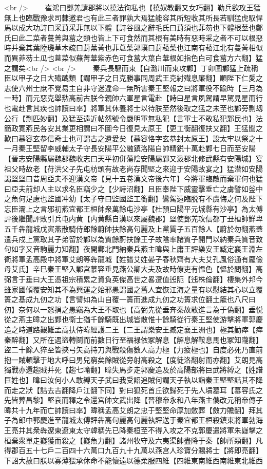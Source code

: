 <br />
　　崔鴻曰鄧羌請郡將以撓法徇私也【撓奴教翻又女巧翻】勒兵欲攻王猛無上也臨戰豫求司隸邀君也有此三者罪孰大焉猛能容其所短收其所長若馴猛虎馭悍馬以成大功詩曰采葑采菲無以下體【詩谷風之辭毛氏曰葑須也菲芴也下體根莖也鄭氏曰此二菜者蔓菁與葍之類也皆上下可食然而其根有美時有惡時采之者不可以根惡時并棄其葉陸璣草木疏曰葑蕪菁也菲蒠菜郭璞曰葑菘菜也江南有菘江北有蔓菁相似而異菲芴土瓜也蒠菜似蕪菁華紫赤色可食葍大葉白華根如指色白可食葍方六翻】猛之謂矣<br />
<br />
　　秦兵長驅而東【自潞川而東攻鄴】丁卯圍鄴猛上疏稱臣以甲子之日大殱醜類【謂甲子之日克勝事同周武王克紂殱息廉翻】順陛下仁愛之志使六州士庶不覺易主自非守迷違命一無所害秦王堅報之曰將軍役不踰時【三月為一時】而元惡克舉勲高前古朕今親帥六軍星言電赴【詩曰星言夙駕謂早駕見星而行也電赴言其疾也帥讀曰率】將軍其休養將士以待朕至然後取之猛之未至也鄴旁剽刼公行【剽匹妙翻】及猛至遠近帖然號令嚴明軍無私犯【言軍士不敢私犯鄴民也】法簡政寛燕民各安其業更相謂曰不圖今日復見太原王【更工衡翻復扶又翻】王猛聞之歎曰慕容玄恭信奇士也可謂古之遺愛矣【慕容恪字玄恭封太原王】設太牢以祭之十一月秦王堅留李威輔太子守長安陽平公融鎮洛陽自帥精鋭十萬赴鄴七日而至安陽【晉志安陽縣屬魏郡魏收志曰天平初併蕩陰安陽屬鄴又汲郡北修武縣有安陽城】宴祖父時故老【苻洪父子先屯枋頭有故老尚存聞堅之來迎于安陽故宴之】猛潜如安陽謁堅堅曰昔周亞夫不迎漢文帝【見十五卷漢文帝後六年】今將軍臨敵而棄軍何也猛曰亞夫前却人主以求名臣竊少之【少詩沼翻】且臣奉陛下威靈擊垂亡之虜譬如釡中之魚何足慮也監國冲幼【太子守曰監國監工銜翻】鸞駕遠臨脱有不虞悔之何及陛下忘臣灞上之言邪初燕宜都王桓帥衆萬餘屯沙亭【杜預曰陽平元城縣有沙亭】為太傅評後繼聞評敗引兵屯内黄【内黄縣自漢以來屬魏郡】堅使鄧羌攻信都丁丑桓帥鮮卑五千犇龍城戊寅燕散騎侍郎餘蔚帥扶餘高句麗及上黨質子五百餘人【蔚於勿翻燕蓋遣兵戍上黨取其子弟留於鄴以為質餘蔚扶餘王子故陰率諸質子開門以納秦兵質音致句如字又音駒麗力知翻】夜開鄴北門納秦兵燕主暐與上庸王評樂安王臧定襄王淵左衛將軍孟高殿中將軍艾朗等犇龍城【姓譜艾姓晏子春秋齊有大夫艾孔風俗通有龎儉母艾氏】辛巳秦王堅入鄴宫慕容垂見燕公卿大夫及故時僚吏有愠色【慍於問翻】高弼言于垂曰大王憑祖宗積累之資負英傑高世之畧遭值迍阨【迍株倫翻】棲集外邦今雖家國傾覆安知其不為興運之始邪愚謂國之舊人宜恢江海之量有以慰結其心以立覆簣之基成九仞之功【言譬如為山自覆一簣而進成九仞之功簣求位翻土籠也八尺曰仞】奈何以一怒捐之愚竊為大王不取也【高弼先從垂奔秦故敢進言為于偽翻】垂悦從之燕主暐之出鄴也衛士猶千餘騎既出城皆散惟十餘騎從行秦王堅使游擊將軍郭慶追之時道路艱難孟高扶侍暐經護二王【二王謂樂安王臧定襄王洲也】極其勤瘁【瘁秦醉翻】又所在遇盜轉鬬而前數日行至福禄依冢解息【解息解鞍息馬也冢知隴翻】盜二十餘人猝至皆挾弓矢高持刀與戰殺傷數人高力極【力疲極也】自度必死乃直前抱一賊頓擊于地大呼曰男兒窮矣餘賊從旁射高殺之【度徒洛翻射而亦翻】艾朗見高獨戰亦還趨賊并死【趨七喻翻】暐失馬步走郭慶追及於高陽部將巨武將縛之【姓譜巨姓也】暐曰汝何小人敢縛天子武曰我受詔追賊何謂天子執以詣秦王堅堅詰其不降而走之狀【詰去吉翻降戶江翻下同】對曰狐死首丘欲歸死于先人墳墓耳【慕容氏之先皆葬昌黎】堅哀而釋之令還宫帥文武出降【晉穆帝永和八年燕主儁改元稱帝傳子暐共十九年而亡帥讀曰率】暐稱孟高艾朗之忠于堅堅命厚加斂葬【斂力贍翻】拜其子為郎中郭慶進至龍城太傅評犇高句麗高句麗執評送于秦宜都王桓殺鎮東將軍勃海王亮并其衆犇遼東遼東太守韓稠先已降秦桓至不得入攻之不克郭慶遣將軍朱嶷擊之桓棄衆單走嶷獲而殺之【嶷魚力翻】諸州牧守及六夷渠帥盡降于秦【帥所類翻】凡得郡百五十七戶二百四十六萬口九百九十九萬以燕宫人珍寶分賜將士【將即亮翻】下詔大赦曰朕以寡薄猥承休命不能懷遠以德柔服四維【四維東南維西南維東北維西